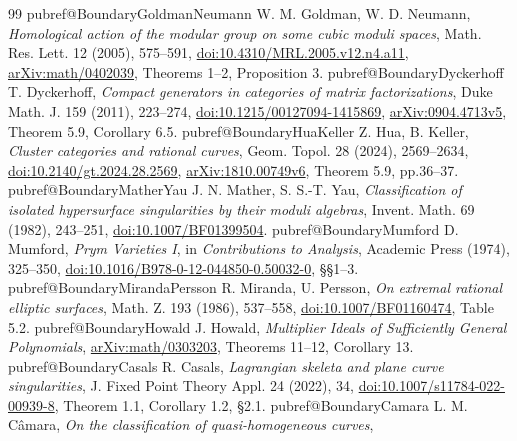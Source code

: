 \begin{thebibliography}{99}
\fi
\ifcsname pubref@BoundaryGoldmanNeumann\endcsname
{} W. M. Goldman, W. D. Neumann,
\emph{Homological action of the modular group on some cubic moduli spaces},
Math. Res. Lett. 12 (2005), 575--591,
\href{https://doi.org/10.4310/MRL.2005.v12.n4.a11}{doi:10.4310/MRL.2005.v12.n4.a11},
\href{https://arxiv.org/abs/math/0402039}{arXiv:math/0402039},
Theorems 1--2, Proposition 3.
\fi
\ifcsname pubref@BoundaryDyckerhoff\endcsname
{} T. Dyckerhoff,
\emph{Compact generators in categories of matrix factorizations},
Duke Math. J. 159 (2011), 223--274,
\href{https://doi.org/10.1215/00127094-1415869}{doi:10.1215/00127094-1415869},
\href{https://arxiv.org/abs/0904.4713v5}{arXiv:0904.4713v5},
Theorem 5.9, Corollary 6.5.
\fi
\ifcsname pubref@BoundaryHuaKeller\endcsname
{} Z. Hua, B. Keller,
\emph{Cluster categories and rational curves},
Geom. Topol. 28 (2024), 2569--2634,
\href{https://doi.org/10.2140/gt.2024.28.2569}{doi:10.2140/gt.2024.28.2569},
\href{https://arxiv.org/abs/1810.00749v6}{arXiv:1810.00749v6},
Theorem 5.9, pp.36--37.
\fi
\ifcsname pubref@BoundaryMatherYau\endcsname
{} J. N. Mather, S. S.-T. Yau,
\emph{Classification of isolated hypersurface singularities by their moduli algebras},
Invent. Math. 69 (1982), 243--251,
\href{https://doi.org/10.1007/BF01399504}{doi:10.1007/BF01399504}.
\fi
\ifcsname pubref@BoundaryMumford\endcsname
{} D. Mumford,
\emph{Prym Varieties I}, in \emph{Contributions to Analysis},
Academic Press (1974), 325--350,
\href{https://doi.org/10.1016/B978-0-12-044850-0.50032-0}{doi:10.1016/B978-0-12-044850-0.50032-0},
\S\S1--3.
\fi
\ifcsname pubref@BoundaryMirandaPersson\endcsname
{} R. Miranda, U. Persson,
\emph{On extremal rational elliptic surfaces},
Math. Z. 193 (1986), 537--558,
\href{https://doi.org/10.1007/BF01160474}{doi:10.1007/BF01160474},
Table 5.2.
\fi
\ifcsname pubref@BoundaryHowald\endcsname
{} J. Howald,
\emph{Multiplier Ideals of Sufficiently General Polynomials},
\href{https://arxiv.org/abs/math/0303203}{arXiv:math/0303203},
Theorems 11--12, Corollary 13.
\fi
\ifcsname pubref@BoundaryCasals\endcsname
{} R. Casals,
\emph{Lagrangian skeleta and plane curve singularities},
J. Fixed Point Theory Appl. 24 (2022), 34,
\href{https://doi.org/10.1007/s11784-022-00939-8}{doi:10.1007/s11784-022-00939-8},
Theorem 1.1, Corollary 1.2, \S2.1.
\fi
\ifcsname pubref@BoundaryCamara\endcsname
{} L. M. C\^amara,
\emph{On the classification of quasi-homogeneous curves},

\end{thebibliography}
